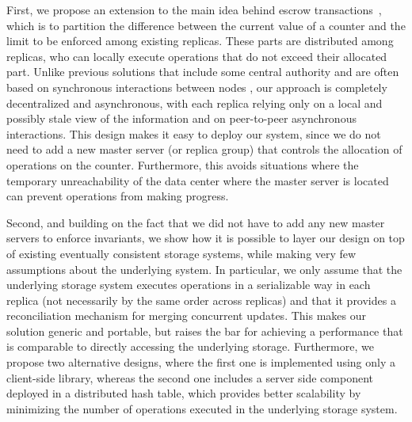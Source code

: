 \documentclass[conference]{IEEEtran}
\begin{document}
First, we propose an extension to the 
main idea behind escrow transactions~\cite{escrow}, which is to
partition the difference between the current value of a counter and the limit to be enforced among existing replicas. These parts are distributed among
replicas, who can locally execute operations that do not exceed their allocated
part.
Unlike previous solutions that include some central authority
and are often based on synchronous interactions between 
nodes \cite{escrow,demarcation,mobisnap,exo-leasing}, our approach is completely
decentralized and asynchronous, with each replica relying only on a local and
possibly stale view of the information and on peer-to-peer asynchronous interactions. 
This design makes it easy to
deploy our system, since we do not need to add a new master server
(or replica group) that
controls the allocation of operations on the counter.
Furthermore, this avoids situations where the temporary 
unreachability of the data center where the master server 
is located can prevent operations from making progress.

Second, and building on the fact that we did not have to add any new
master servers to enforce invariants, we show how it is possible to
layer our design on top of existing eventually consistent storage
systems, while making very few assumptions about the underlying
system. In particular, we only assume that the underlying storage
system executes operations in a serializable way in each replica (not
necessarily by the same order across replicas) and that it provides a
reconciliation mechanism for merging concurrent updates. This makes
our solution generic and portable, but raises the bar
for achieving a performance that is comparable to directly accessing
the underlying storage.
Furthermore, we propose two alternative designs, where the first one
is implemented using only a client-side library, whereas the second one includes
a server side component deployed in a distributed hash table, which provides 
better scalability by minimizing the number of operations executed 
in the underlying storage system.
\end{document}
